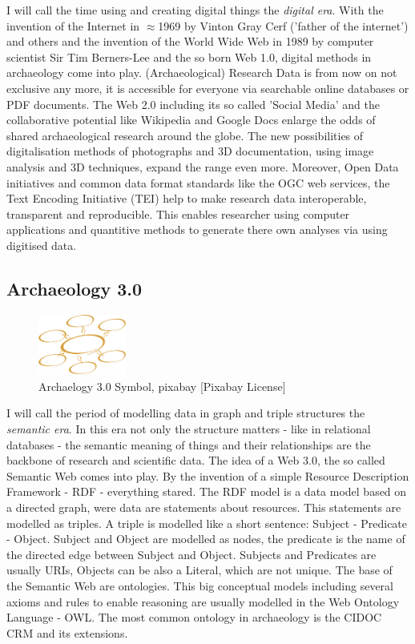 \documentclass[twocolumn]{autart}
\begin{document}
I will call the time using and creating digital things the \textit{digital era}. With the invention of the Internet in $\approx$1969 by Vinton Gray Cerf ('father of the internet') and others and the invention of the World Wide Web in 1989 by computer scientist Sir Tim Berners-Lee and the so born Web 1.0, digital methods in archaeology come into play. (Archaeological) Research Data is from now on not exclusive any more, it is accessible for everyone via searchable online databases or PDF documents. The Web 2.0 including its so called 'Social Media' and the collaborative potential like Wikipedia and Google Docs enlarge the odds of shared archaeological research around the globe. The new possibilities of digitalisation methods of photographs and 3D documentation, using image analysis and 3D techniques, expand the range even more. Moreover, Open Data initiatives and common data format standards like the OGC web services, the Text Encoding Initiative (TEI) help to make research data interoperable, transparent and reproducible. This enables researcher using computer applications and quantitive methods to generate there own analyses via using digitised data.

\subsection{Archaeology 3.0}

\begin{figure}[!htb]
\begin{center}
\includegraphics[height=2cm]{a30.png}
\caption{Archaelogy 3.0 Symbol, pixabay [Pixabay License]}
\label{figa30symbol}
\end{center}
\end{figure}

I will call the period of modelling data in graph and triple structures the \textit{semantic era}. In this era not only the structure matters - like in relational databases - the semantic meaning of things and their relationships are the backbone of research and scientific data. The idea of a Web 3.0, the so called Semantic Web comes into play. By the invention of a simple Resource Description Framework - RDF - everything stared. The RDF model is a data model based on a directed graph, were data are statements about resources. This statements are modelled as triples. A triple is modelled like a short sentence: Subject - Predicate - Object. Subject and Object are modelled as nodes, the predicate is the name of the directed edge between Subject and Object. Subjects and Predicates are usually URIs, Objects can be also a Literal, which are not unique. The base of the Semantic Web are ontologies. This big conceptual models including several axioms and rules to enable reasoning are usually modelled in the Web Ontology Language - OWL. The most common ontology in archaeology is the CIDOC CRM and its extensions.
\end{document}
